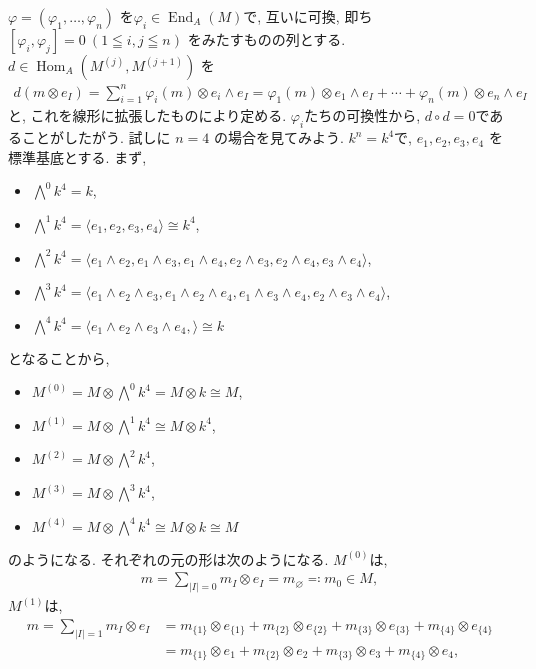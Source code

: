 \documentclass[11pt, a4paper, dvipdfmx]{jsarticle}
\theoremstyle{definition}
\newcommand{\Hom}{\mathop{\mathrm{Hom}}\nolimits}
\newcommand{\End}{\mathop{\mathrm{End}}\nolimits}
\newcommand{\pphi}{\varphi} %
\numberwithin{equation}{section}
\begin{document}
$\pphi = (\pphi_1,\ldots,\pphi_n)$
を$\pphi_i\in\End_A(M)$で, 
互いに可換, 即ち
$[\pphi_i,\pphi_j]=0 \ (1\leqq i,j \leqq n)$
をみたすものの列とする. 
$d\in \Hom_A(M^{(j)}, M^{(j+1)})$ を
\begin{align*}
    d(m\otimes e_I) 
    = \sum_{i=1}^n\pphi_i(m)\otimes e_i\wedge e_I
    = \pphi_1(m)\otimes e_1\wedge e_I 
    +\cdots+ \pphi_n(m)\otimes e_n\wedge e_I
\end{align*}
と, これを線形に拡張したものにより定める. 
$\pphi_i$たちの可換性から, 
$d\circ d = 0$であることがしたがう. 
試しに $n=4$ の場合を見てみよう. 
$k^n = k^4$で, $e_1,e_2,e_3,e_4$ を標準基底とする. まず, 
\begin{itemize}
    \item $\bigwedge^0 k^4 =k$,
    \item $\bigwedge^1 k^4 =
    \langle 
        e_1, e_2, e_3, e_4 
    \rangle \cong k^4$,
    \item $\bigwedge^2 k^4 =
    \langle 
        e_1\wedge e_2, e_1\wedge e_3, e_1\wedge e_4, 
        e_2\wedge e_3, e_2\wedge e_4, e_3\wedge e_4 
    \rangle$,
    \item $\bigwedge^3 k^4 =
    \langle 
        e_1\wedge e_2\wedge e_3, e_1\wedge e_2\wedge e_4, 
        e_1\wedge e_3\wedge e_4, e_2\wedge e_3\wedge e_4
    \rangle$,
    \item $\bigwedge^4 k^4 =
    \langle 
        e_1\wedge e_2\wedge e_3\wedge e_4, 
    \rangle
    \cong k$
\end{itemize}
となることから, 
\begin{itemize}
    \item $M^{(0)} = M\otimes \bigwedge^0 k^4 = M\otimes k\cong M$,
    \item $M^{(1)} = M\otimes \bigwedge^1 k^4 
        \cong M \otimes k^4$,
    \item $M^{(2)} = M\otimes \bigwedge^2 k^4$,
    \item $M^{(3)} = M\otimes \bigwedge^3 k^4$,
    \item $M^{(4)} = M\otimes \bigwedge^4 k^4
    \cong M\otimes k\cong M$
\end{itemize}
のようになる. それぞれの元の形は次のようになる. 
$M^{(0)}$は, 
\begin{align*}
    m = \sum_{|I|=0}m_I\otimes e_I 
    = m_\varnothing \eqqcolon m_0 \in M,
\end{align*}
$M^{(1)}$は,
\begin{align*}
    m = \sum_{|I|=1}m_I\otimes e_I 
        &= m_{\{1\}}\otimes e_{\{1\}}+ m_{\{2\}}\otimes e_{\{2\}}
        + m_{\{3\}}\otimes e_{\{3\}}+ m_{\{4\}}\otimes e_{\{4\}}\\
        &=m_{\{1\}}\otimes e_1+ m_{\{2\}}\otimes e_2
        + m_{\{3\}}\otimes e_3+ m_{\{4\}}\otimes e_4,
\end{align*}
\end{document}
